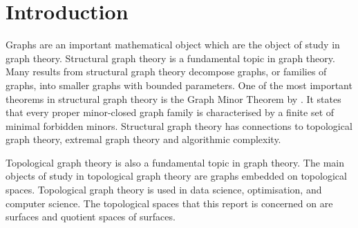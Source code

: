 \chapter{Introduction}\label{sec:introduction}
Graphs are an important mathematical object which are the object of study in graph theory. 
Structural graph theory is a fundamental topic in graph theory. Many results from structural graph theory decompose graphs, or families of graphs, into smaller graphs with bounded parameters. One of the most important theorems in structural graph theory is the Graph Minor Theorem by \textcite{robertsonGraphMinorsXX2004}. It states that every proper minor-closed graph family is characterised by a finite set of minimal forbidden minors. Structural graph theory has connections to topological graph theory, extremal graph theory and algorithmic complexity. 

Topological graph theory is also a fundamental topic in graph theory. The main objects of study in topological graph theory are graphs embedded on topological spaces. Topological graph theory is used in data science, optimisation, and computer science. The topological spaces that this report is concerned on are surfaces and quotient spaces of surfaces. 




\newpage

%

%

%

